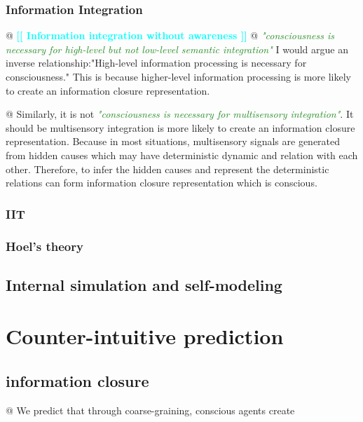 \documentclass[utf8]{article}
\newenvironment{ants}
			{
			 \begin{easylist}[itemize]
			}
			{
			\end{easylist}
			}
\newcommand{\rewrite}[1]{\textcolor{ForestGreen}{\textit{"#1"}}\newline}
\newcommand{\toWrite}[1]{\noindent
			\textcolor{Cyan}{\textbf{[[ #1 ]]}}}
\newcommand{\callforhelp}[1]{\todo[color=SpringGreen]{#1}}
\begin{document}
			\subsubsection{Information Integration}
				\begin{ants}
					@ \toWrite{Information integration without awareness}\cite{Mudrik_Faivre_Koch}
					@ \rewrite{consciousness is necessary for high-level but not low-level semantic integration}\cite{Mudrik_Faivre_Koch} I would argue an inverse relationship:"High-level information processing is necessary for consciousness." This is because higher-level information processing is more likely to create an information closure representation. 
					
					@ Similarly, it is not \rewrite{consciousness is necessary for multisensory integration}. It should be multisensory integration is more likely to create an information closure representation. Because in most situations, multisensory signals are generated from hidden causes which may have deterministic dynamic and relation with each other. Therefore, to infer the hidden causes and represent the deterministic relations can form information closure representation which is conscious.  
					
				\end{ants}
			
			
			\subsubsection{IIT}
			
			\subsubsection{Hoel's theory}
				\callforhelp{Help from Marting?}
				
		\subsection{Internal simulation and self-modeling}
		
		
		
	\section{Counter-intuitive prediction}	
	
		\subsection{information closure}
			\begin{ants}
				@ We predict that through coarse-graining, conscious agents create 
			\end{ants}
			
\end{document}
